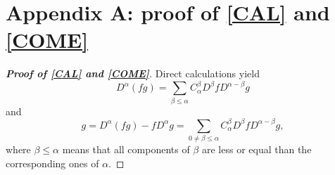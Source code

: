 \documentclass[12pt,reqno]{amsart}
\numberwithin{equation}{section}
\begin{document}
\section{Appendix A: proof of \eqref{CAL} and \eqref{COME}}
\begin{proof}[\textbf{Proof of \eqref{CAL} and \eqref{COME}}]
Direct calculations yield
\begin{equation}
  D^\alpha(fg)=\sum_{\beta\leq\alpha}C_\alpha^\beta D^\beta fD^{\alpha-\beta}g\label{1028-0}
\end{equation}
and
\begin{equation}
 [D^\alpha, f]g=D^\alpha(fg)-fD^\alpha g=\sum_{0\not=\beta\leq\alpha}C_\alpha^\beta D^\beta fD^{\alpha-\beta}g,\label{1028-00}
\end{equation}
where $\beta\leq\alpha$ means that all components of $\beta$ are less or equal than the corresponding ones of $\alpha$.


\end{proof}
\end{document}

